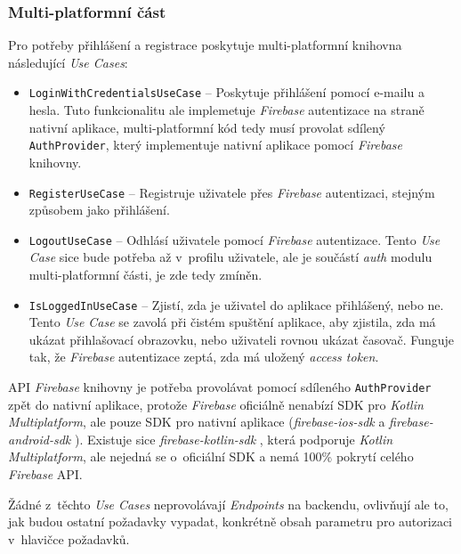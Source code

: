 \subsubsection{Multi-platformní část}

Pro potřeby přihlášení a registrace poskytuje multi-platformní knihovna následující \emph{Use Cases}:
\begin{itemize}
\item\texttt{LoginWithCredentialsUseCase} – Poskytuje přihlášení pomocí e-mailu a hesla. Tuto funkcionalitu ale implemetuje \emph{Firebase} autentizace na straně nativní aplikace, multi-platformní kód tedy musí provolat sdílený \texttt{AuthProvider}, který implementuje nativní aplikace pomocí \emph{Firebase} knihovny.
\item\texttt{RegisterUseCase} – Registruje uživatele přes \emph{Firebase} autentizaci, stejným způsobem jako přihlášení.
\item\texttt{LogoutUseCase} – Odhlásí uživatele pomocí \emph{Firebase} autentizace. Tento \emph{Use Case} sice bude potřeba až v~profilu uživatele, ale je součástí \emph{auth} modulu multi-platformní části, je zde tedy zmíněn.
\item\texttt{IsLoggedInUseCase} – Zjistí, zda je uživatel do aplikace přihlášený, nebo ne. Tento \emph{Use Case} se zavolá při čistém spuštění aplikace, aby zjistila, zda má ukázat přihlašovací obrazovku, nebo uživateli rovnou ukázat časovač. Funguje tak, že \emph{Firebase} autentizace zeptá, zda má uložený \emph{access token}.
\end{itemize}

API \emph{Firebase} knihovny je potřeba provolávat pomocí sdíleného \texttt{AuthProvider} zpět do nativní aplikace, protože \emph{Firebase} oficiálně nenabízí SDK pro \emph{Kotlin Multiplatform}, ale pouze SDK pro nativní aplikace (\emph{firebase-ios-sdk} \cite{firebase-ios-sdk} a \emph{firebase-android-sdk} \cite{firebase-android-sdk}). Existuje sice \emph{firebase-kotlin-sdk} \cite{firebase-kotlin-sdk}, která podporuje \emph{Kotlin Multiplatform}, ale nejedná se o~oficiální SDK a nemá 100\% pokrytí celého \emph{Firebase} API.

Žádné z~těchto \emph{Use Cases} neprovolávají \emph{Endpoints} na backendu, ovlivňují ale to, jak budou ostatní požadavky vypadat, konkrétně obsah parametru pro autorizaci v~hlavičce požadavků.

